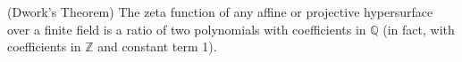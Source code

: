 (Dwork's Theorem) The zeta function of any affine or projective hypersurface over a finite field is a ratio of two polynomials with coefficients in $\mathbb{Q}$ (in fact, with coefficients in $\mathbb{Z}$ and constant term 1).